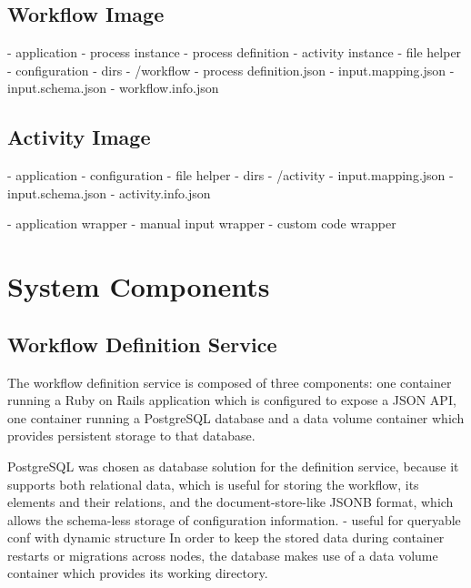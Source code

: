   \subsection{Workflow Image} %
  \label{sub:workflow_container}
    - application
      - process instance
      - process definition
      - activity instance
      - file helper
      - configuration
    - dirs
      - /workflow
        - process definition.json
        - input.mapping.json
        - input.schema.json
        - workflow.info.json


  \subsection{Activity Image} %
  \label{sub:activity_containers}
    - application
      - configuration
      - file helper
    - dirs
      - /activity
        - input.mapping.json
        - input.schema.json
        - activity.info.json

    - application wrapper
    - manual input wrapper
    - custom code wrapper

\section{System Components} %
\label{sec:components_implementation}
  \subsection{Workflow Definition Service} %
    \label{sub:workflow_definition_service}

    The workflow definition service is composed of three components: one container running a Ruby on Rails application which is configured to expose a JSON API, one container running a PostgreSQL database and a data volume container which provides persistent storage to that database.

    PostgreSQL was chosen as database solution for the definition service, because it supports both relational data, which is useful for storing the workflow, its elements and their relations, and the document-store-like JSONB format, which allows the schema-less storage of configuration information.
    - useful for queryable conf with dynamic structure
    In order to keep the stored data during container restarts or migrations across nodes, the database makes use of a data volume container which provides its working directory.

